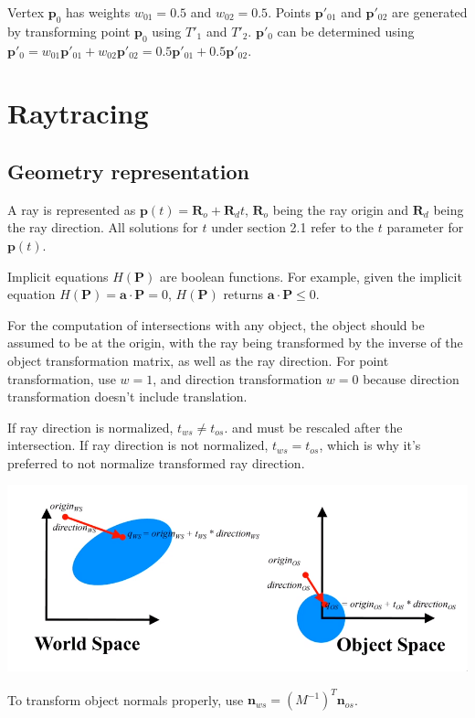 \documentclass[12pt]{article}
\begin{document}
Vertex $\bm p_0$ has weights $w_{01} = 0.5$ and $w_{02} = 0.5$. Points
$\bm p'_{01}$ and $\bm p'_{02}$ are generated by transforming point
$\bm p_0$ using $T'_1$ and $T'_2$. $\bm p'_0$ can be determined using
$\bm p'_0 = w_{01}\bm p'_{01} + w_{02}\bm p'_{02} = 0.5\bm p'_{01} + 0.5
\bm p'_{02}$.

\section{Raytracing}

\subsection{Geometry representation}

A ray is represented as $\bm p(t) = \bm R_o + \bm R_d t$, $\bm R_o$
being the ray origin and $\bm R_d$ being the ray direction. All
solutions for $t$ under section 2.1 refer
to the $t$ parameter for $\bm p(t)$.

Implicit equations $H(\bm P)$ are boolean functions.
For example, given the implicit equation $H(\bm P) = \bm a \cdot \bm P = 0$,
$H(\bm P)$ returns $\bm a \cdot \bm P \le 0$.

For the computation of intersections with any object, the object should be
assumed to be at the origin, with the ray being transformed by the inverse
of the object transformation matrix, as well as the ray direction.
For point transformation, use $w = 1$, and direction transformation
$w = 0$ because direction transformation doesn't include translation.

If ray direction is normalized, $t_{ws} \ne t_{os}$.
and must be rescaled after the intersection. If ray direction is not normalized,
$t_{ws} = t_{os}$, which is why it's preferred to not normalize
transformed ray direction.

\includegraphics[scale=.5]{images/raytrace-world-to-object.png}

To transform object normals properly, use $\bm n_{ws} = (M^{-1})^T \bm
n_{os}$.
\end{document}
